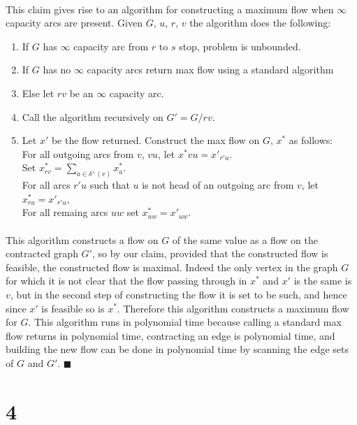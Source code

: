 \documentclass[letterpaper,12pt,oneside,onecolumn]{article}
\begin{document}
\paragraph{}
This claim gives rise to an algorithm for constructing a maximum flow when $\infty$ capacity arcs are present. Given $G$, $u$, $r$, $v$ the algorithm does the following:
\begin{enumerate}
\item If $G$ has $\infty$ capacity arc from $r$ to $s$ stop, problem is unbounded.\\
\item If $G$ has no $\infty$ capacity arcs return max flow using a standard algorithm\\
\item Else let $rv$ be an $\infty$ capacity arc.\\
\item Call the algorithm recursively on $G' = G/rv$.\\
\item Let $x'$ be the flow returned. Construct the max flow on $G$, $x^*$ as follows:\\
\subitem For all outgoing arcs from $v$, $vu$, let $x^*{vu} = x'_{r'u}$.\\
\subitem Set $x^*_{rv} = \sum_{a \in \delta^+(v)} x^*_{a}$.\\
\subitem For all arcs $r'u$ such that $u$ is not head of an outgoing arc from $v$, let $x^*_{ru} = x'_{r'u}$,\\
\subitem For all remaing arcs $uw$ set $x^*_{uw} = x'_{uw}$.
\end{enumerate}
\paragraph{}
This algorithm constructs a flow on $G$ of the same value as a flow on the contracted graph $G'$, so by our claim, provided that the constructed flow is feasible, the constructed flow is maximal. Indeed the only vertex in the graph $G$ for which it is not clear that the flow passing through in $x^*$ and $x'$ is the same is $v$, but in the second step of constructing the flow it is set to be such, and hence since $x'$ is feasible so is $x^*$. Therefore this algorithm constructs a maximum flow for $G$. This algorithm runs in polynomial time because calling a standard max flow returns in polynomial time, contracting an edge is polynomial time, and building the new flow can be done in polynomial time by scanning the edge sets of $G$ and $G'$. $\blacksquare$

\section*{4}
\end{document}
